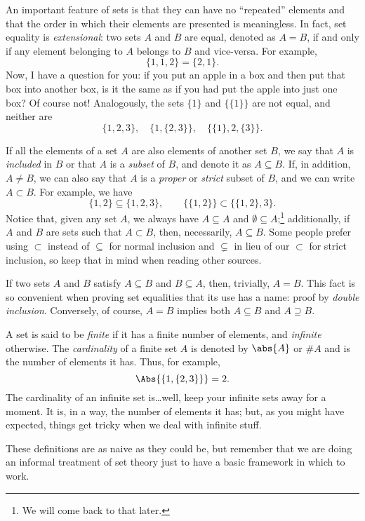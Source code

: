 \begin{para}
An important feature of sets is that they can have no ``repeated'' elements and that the order in which their elements are presented is meaningless.
In fact, set equality is \emph{extensional}: two sets $A$ and $B$ are equal, denoted as $A = B$, if and only if any element belonging to $A$ belongs to $B$ and vice-versa.
For example,
\[ \{1,1,2\} = \{2,1\}.\]
Now, I have a question for you: if you put an apple in a box and then put that box into another box, is it the same as if you had put the apple into just one box? Of course not!
Analogously, the sets $\{1\}$ and $\{\{1\}\}$ are not equal, and neither are
\[\{1,2,3\},\quad\{1,\{2,3\}\},\quad \{\{1\},2,\{3\}\}.\]

If all the elements of a set $A$ are also elements of another set $B$, we say that $A$ is \emph{included} in $B$ or that $A$ is a \emph{subset} of $B$, and denote it as $A \subseteq B$.
If, in addition, $A\neq B$, we can also say that $A$ is a \emph{proper} or \emph{strict} subset of $B$, and we can write $A\subset B$. 
For example, we have
\[\{1,2\} \subseteq \{1,2,3\},\qquad \{\{1,2\}\}\subset\{\{1,2\},3\}.\]
Notice that, given any set $A$, we always have $A\subseteq A$ and $\emptyset\subseteq A$;\footnote{We will come back to that later.} additionally, if $A$ and $B$ are sets such that $A\subset B$, then, necessarily, $A\subseteq B$.
Some people prefer using $\subset$ instead of $\subseteq$ for normal inclusion and $\subsetneq$ in lieu of our $\subset$ for strict inclusion, so keep that in mind when reading other sources.

If two sets $A$ and $B$ satisfy $A\subseteq B$ and $B \subseteq A$, then, trivially, $A = B$.
This fact is so convenient when proving set equalities that its use has a name: proof by \emph{double inclusion}.
Conversely, of course, $A = B$ implies both $A \subseteq B$ and $A \supseteq B$.
\end{para}

\begin{para}[Cardinality]
A set is said to be \emph{finite} if it has a finite number of elements, and \emph{infinite} otherwise.
The \emph{cardinality} of a finite set $A$ is denoted by $\abs{A}$ or $\#A$ and is the number of elements it has. Thus, for example,
\[ \Abs{\{1,\{2,3\}\}} = 2.\]
The cardinality of an infinite set is\ldots well, keep your infinite sets away for a moment. It is, in a way, the number of elements it has; but, as you might have expected, things get tricky when we deal with infinite stuff.

These definitions are as naive as they could be, but remember that we are doing an informal treatment of set theory just to have a basic framework in which to work.
\end{para}

